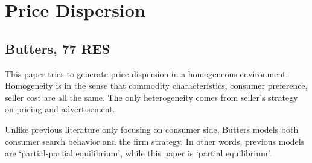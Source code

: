 \documentclass{book}
\theoremstyle{plain}
\theoremstyle{definition}
\begin{document}






\chapter{Price Dispersion} %
\label{cha:price_dispersion}

\section{Butters, 77 RES} %
\label{sec:butters_77_res}

\textbf{}

This paper tries to generate price dispersion in a homogeneous environment. Homogeneity is in the sense that commodity characteristics, consumer preference, seller cost are all the same. The only heterogeneity comes from seller's strategy on pricing and advertisement.

Unlike previous literature only focusing on consumer side, Butters models both consumer search behavior and the firm strategy. In other words, previous models are `partial-partial equilibrium', while this paper is `partial equilibrium'.
\end{document}
